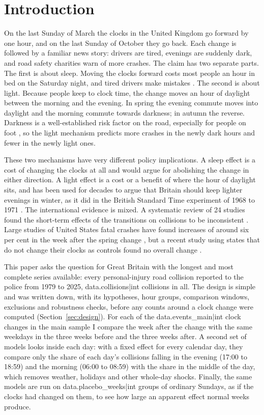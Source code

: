 \documentclass[11pt,a4paper]{article}
\begin{document}
\section{Introduction}\label{sec:intro}
On the last Sunday of March the clocks in the United Kingdom go forward by one hour, and on the last Sunday of October they go back. Each change is followed by a familiar news story: drivers are tired, evenings are suddenly dark, and road safety charities warn of more crashes. The claim has two separate parts. The first is about sleep. Moving the clocks forward costs most people an hour in bed on the Saturday night, and tired drivers make mistakes \citep{harrison2013,kantermann2007}. The second is about light. Because people keep to clock time, the change moves an hour of daylight between the morning and the evening. In spring the evening commute moves into daylight and the morning commute towards darkness; in autumn the reverse. Darkness is a well-established risk factor on the road, especially for people on foot \citep{plainis2006,sullivan2007,uttley2017aap}, so the light mechanism predicts more crashes in the newly dark hours and fewer in the newly light ones.

These two mechanisms have very different policy implications. A sleep effect is a cost of changing the clocks at all and would argue for abolishing the change in either direction. A light effect is a cost or a benefit of where the hour of daylight sits, and has been used for decades to argue that Britain should keep lighter evenings in winter, as it did in the British Standard Time experiment of 1968 to 1971 \citep{homeoffice1970,broughton1999}. The international evidence is mixed. A systematic review of 24 studies found the short-term effects of the transitions on collisions to be inconsistent \citep{carey2017}. Large studies of United States fatal crashes have found increases of around six per cent in the week after the spring change \citep{smith2016,fritz2020}, but a recent study using states that do not change their clocks as controls found no overall change \citep{lei2026}.

This paper asks the question for Great Britain with the longest and most complete series available: every personal-injury road collision reported to the police from 1979 to 2025, {{data.collisions|int}} collisions in all. The design is simple and was written down, with its hypotheses, hour groups, comparison windows, exclusions and robustness checks, before any counts around a clock change were computed (Section~\ref{sec:design}). For each of the {{data.events_main|int}} clock changes in the main sample I compare the week after the change with the same weekdays in the three weeks before and the three weeks after. A second set of models looks inside each day: with a fixed effect for every calendar day, they compare only the share of each day's collisions falling in the evening (17:00 to 18:59) and the morning (06:00 to 08:59) with the share in the middle of the day, which removes weather, holidays and other whole-day shocks. Finally, the same models are run on {{data.placebo_weeks|int}} groups of ordinary Sundays, as if the clocks had changed on them, to see how large an apparent effect normal weeks produce.
\end{document}

